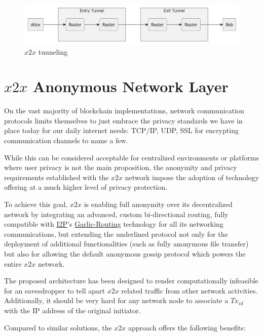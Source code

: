 \begin{figure}
\includegraphics[scale=0.18]{tunnels}
\caption{$x2x$ tunneling}
\label{tunn}
\end{figure}


\section{\texorpdfstring{\(x2x\) Anonymous Network
Layer}{x2x Anonymous Network Layer}}


On the vast majority of blockchain implementations, network
communication protocols limits themselves to just embrace the privacy
standards we have in place today for our daily internet needs: TCP/IP,
UDP, SSL for encrypting communication channels to name a few.

While this can be considered acceptable for centralized environments or
platforms where user privacy is not the main proposition, the anonymity
and privacy requirements established with the \(x2x\) network impose the
adoption of technology offering at a much higher level of privacy
protection.

To achieve this goal, \(x2x\) is enabling full anonymity over its
decentralized network by integrating an advanced, custom bi-directional
routing, fully compatible with \href{https://geti2p.net/en/}{I2P}'s
\href{https://en.wikipedia.org/wiki/Garlic_routing}{Garlic-Routing}
technology for all its networking communications, but extending the
underlined protocol not only for the deployment of additional
functionalities (such as fully anonymous file transfer) but also for
allowing the default anonymous gossip protocol which powers the entire
\(x2x\) network.

The proposed architecture has been designed to render computationally
infeasible for an eavesdropper to tell apart \(x2x\) related traffic
from other network activities. Additionally, it should be very hard for
any network node to associate a \(Tx_{id}\) with the IP address of the
original initiator.

Compared to similar solutions, the \(x2x\) approach offers the following
benefits:

